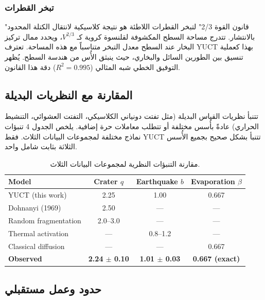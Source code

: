 \documentclass[11pt,a4paper]{article}
\begin{document}
	\subsubsection{تبخر القطرات}
	"قانون القوة 2/3" لتبخر القطرات اللاطئة هو نتيجة كلاسيكية لانتقال الكتلة المحدود بالانتشار. تتدرج مساحة السطح المكشوفة لقلنسوة كروية كـ \(V^{2/3}\)، ويحدد ممال تركيز البخار عند السطح معدل التبخر متناسباً مع هذه المساحة. تعترف YUCT بهذا كعملية تنسيق بين الطورين السائل والبخاري، حيث ينبثق الأُس من هندسة السطح. يُظهر التوفيق الخطي شبه المثالي (\(R^2 = 0.995\)) دقة هذا القانون.
	
	\subsection{المقارنة مع النظريات البديلة}
	
	تتنبأ نظريات القياس البديلة (مثل تفتت دونياني الكلاسيكي، التفتت العشوائي، التنشيط الحراري) عادةً بأُسس مختلفة أو تتطلب معاملات حرة إضافية. يلخص الجدول 4 تنبؤات نماذج مختلفة لمجموعات البيانات الثلاث. فقط YUCT تتنبأ بشكل صحيح بجميع الأُسس الثلاثة بثابت شامل واحد.
	
	\begin{otherlanguage}{english}
		\begin{table}[htbp]
			\centering
			\caption{مقارنة التنبؤات النظرية لمجموعات البيانات الثلاث.}
			\label{tab:comparison}
			\begin{tabular}{lccc}
				\toprule
				\textbf{Model} & \textbf{Crater $q$} & \textbf{Earthquake $b$} & \textbf{Evaporation $\beta$} \\
				\midrule
				YUCT (this work) & 2.25 & 1.00 & 0.667 \\
				Dohnanyi (1969) & 2.50 & — & — \\
				Random fragmentation & 2.0–3.0 & — & — \\
				Thermal activation & — & 0.8–1.2 & — \\
				Classical diffusion & — & — & 0.667 \\
				\textbf{Observed} & \textbf{2.24 $\pm$ 0.10} & \textbf{1.01 $\pm$ 0.03} & \textbf{0.667 (exact)} \\
				\bottomrule
			\end{tabular}
		\end{table}
	\end{otherlanguage}
	
	\subsection{حدود وعمل مستقبلي}
	
\end{document}
